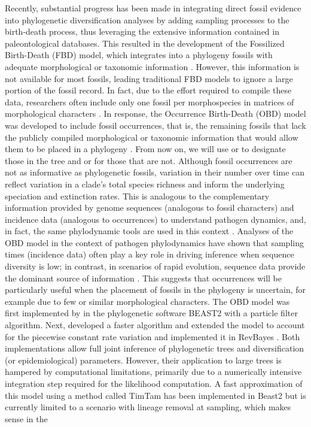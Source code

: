 \documentclass[oupdraft]{sysbio}
\begin{document}
Recently, substantial progress has been made in integrating direct fossil evidence into phylogenetic diversification analyses by adding sampling processes to the birth-death process, thus leveraging the extensive information contained in paleontological databases. This resulted in the development of the Fossilized Birth-Death (FBD) model, which integrates into a phylogeny fossils with adequate morphological or taxonomic information \citep{stadler_sampling-through-time_2010, heath_fossilized_2014}. However, this information is not available for most fossils, leading traditional FBD models to ignore a large portion of the fossil record. In fact, due to the effort required to compile these data, researchers often include only one fossil per morphospecies in matrices of morphological characters \citep{wright_integrating_2022}. In response, the Occurrence Birth-Death (OBD) model was developed to include fossil occurrences, that is, the remaining fossils that lack the publicly compiled morphological or taxonomic information that would allow them to be placed in a phylogeny \citep{vaughan_estimating_2019, gupta_probability_2020, andreoletti_occurrence_2022}. From now on, we will use  or  to designate those in the tree and  or  for those that are not. Although fossil occurrences are not as informative as phylogenetic fossils, variation in their number over time can reflect variation in a clade's total species richness and inform the underlying speciation and extinction rates. This is analogous to the complementary information provided by genome sequences (analogous to fossil characters) and incidence data (analogous to occurrences) to understand pathogen dynamics, and, in fact, the same phylodynamic tools are used in this context \citep{macpherson_unifying_2022, stadler_decoding_2024}. Analyses of the OBD model in the context of pathogen phylodynamics have shown that sampling times (incidence data) often play a key role in driving inference when sequence diversity is low; in contrast, in scenarios of rapid evolution, sequence data provide the dominant source of information \citep{featherstone_decoding_2023}. This suggests that occurrences will be particularly useful when the placement of fossils in the phylogeny is uncertain, for example due to few or similar morphological characters. The OBD model was first implemented by \citet{vaughan_estimating_2019} in the phylogenetic software BEAST2 \citep{bouckaert_beast_2019} with a particle filter algorithm. Next, \citet{gupta_probability_2020} developed a faster algorithm and \citet{andreoletti_occurrence_2022} extended the model to account for the piecewise constant rate variation and implemented it in RevBayes \citep{hohna_revbayes_2016}. Both implementations allow full joint inference of phylogenetic trees and diversification (or epidemiological) parameters. However, their application to large trees is hampered by computational limitations, primarily due to a numerically intensive integration step required for the likelihood computation. A fast approximation of this model using a method called TimTam \citep{zarebski_estimating_2025} has been implemented in Beast2 but is currently limited to a scenario with lineage removal at sampling, which makes sense in the 
\end{document}

